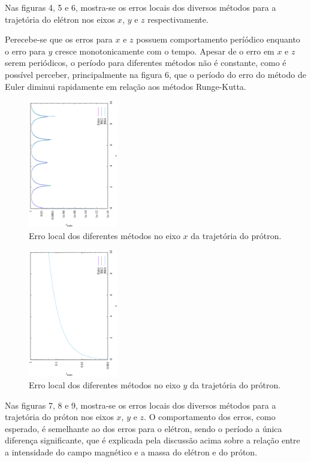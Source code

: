 \documentclass[brazilian, 12pt, a4paper, final]{article}
\begin{document}
\begin{multicols*}{2}
Nas figuras 4, 5 e 6, mostra-se os erros locais dos diversos métodos para a trajetória do elétron nos eixos $x$, $y$ e $z$ respectivamente.

Perecebe-se que os erros para $x$ e $z$ possuem comportamento períódico enquanto o erro para $y$ cresce monotonicamente com o tempo. Apesar de o erro em $x$ e $z$ serem periódicos, o período para diferentes métodos não é constante, como é possível perceber, principalmente na figura 6, que o período do erro do método de Euler diminui rapidamente em relação aos métodos Runge-Kutta.

\begin{figure}[H]
  \centering
 \includegraphics[width=0.35\textwidth,angle=-90]{figuras/px_error.eps}
  \caption{Erro local dos diferentes métodos no eixo $x$ da trajetória do prótron.}
\end{figure}

\begin{figure}[H]
  \centering
 \includegraphics[width=0.35\textwidth,angle=-90]{figuras/py_error.eps}
  \caption{Erro local dos diferentes métodos no eixo $y$ da trajetória do prótron.}
\end{figure}

Nas figuras 7, 8 e 9, mostra-se os erros locais dos diversos métodos para a trajetória do próton nos eixos $x$, $y$ e $z$. O comportamento dos erros, como esperado, é semelhante ao dos erros para o elétron, sendo o período a única diferença significante, que é explicada pela discussão acima sobre a relação entre a intensidade do campo magnético e a massa do elétron e do próton. 


\end{multicols*}
\end{document}
